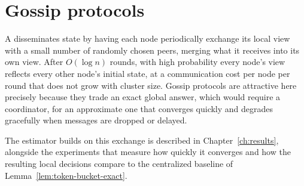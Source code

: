\section{Gossip protocols}

A  disseminates state by having each node periodically exchange its
local view with a small number of randomly chosen peers, merging what it receives into its
own view. After $O(\log n)$ rounds, with high probability every node's view reflects every
other node's initial state, at a communication cost per node per round that does not grow
with cluster size. Gossip protocols are attractive here precisely because they trade an
exact global answer, which would require a coordinator, for an approximate one that
converges quickly and degrades gracefully when messages are dropped or delayed.

The estimator \sysname{} builds on this exchange is described in
Chapter~\ref{ch:results}, alongside the experiments that measure how quickly it converges
and how the resulting local decisions compare to the centralized baseline of
Lemma~\ref{lem:token-bucket-exact}.
